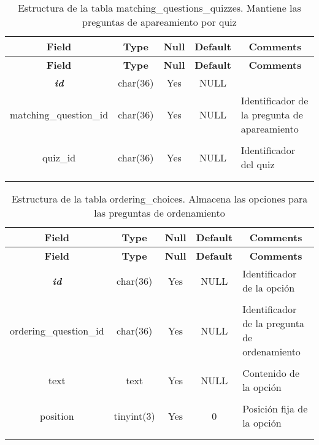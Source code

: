 %
%
\begin{longtable}{c c c c l}
	\multicolumn{1}{c}{\textbf{Field}} &
	\multicolumn{1}{c}{\textbf{Type}} &
	\multicolumn{1}{c}{\textbf{Null}} &
	\multicolumn{1}{c}{\textbf{Default}} &
	\multicolumn{1}{c}{\textbf{Comments}} \\ \hline \hline
\endfirsthead
	\multicolumn{1}{c}{\textbf{Field}} &
	\multicolumn{1}{c}{\textbf{Type}} &
	\multicolumn{1}{c}{\textbf{Null}} &
	\multicolumn{1}{c}{\textbf{Default}} &
	\multicolumn{1}{c}{\textbf{Comments}} \\ \hline \hline
\endhead \endfoot
	\textbf{\textit{id}} & char(36) & Yes & NULL \\ \hline 
	matching\_question\_id & char(36) & Yes & NULL & \parbox[t]{0.35\textwidth}{Identificador de la pregunta de apareamiento} \\ \\  \hline
	quiz\_id & char(36) & Yes & NULL & \parbox[t]{0.35\textwidth}{Identificador del quiz} \\ \\ 
\caption[Estructura de la tabla matching\_questions\_quizzes]{Estructura de la tabla matching\_questions\_quizzes. Mantiene las preguntas de apareamiento por quiz} \label{tab:quiz_matching_questions_quizzes-structure} \\
\end{longtable}

%
%
\begin{longtable}{c c c c l}
	\multicolumn{1}{c}{\textbf{Field}} &
	\multicolumn{1}{c}{\textbf{Type}} &
	\multicolumn{1}{c}{\textbf{Null}} &
	\multicolumn{1}{c}{\textbf{Default}} &
	\multicolumn{1}{c}{\textbf{Comments}} \\ \hline \hline
\endfirsthead
	\multicolumn{1}{c}{\textbf{Field}} &
	\multicolumn{1}{c}{\textbf{Type}} &
	\multicolumn{1}{c}{\textbf{Null}} &
	\multicolumn{1}{c}{\textbf{Default}} &
	\multicolumn{1}{c}{\textbf{Comments}} \\ \hline \hline
\endhead \endfoot
	\textbf{\textit{id}} & char(36) & Yes & NULL & \parbox[t]{0.35\textwidth}{Identificador de la opción} \\ \\  \hline
	ordering\_question\_id & char(36) & Yes & NULL  & \parbox[t]{0.35\textwidth}{Identificador de la pregunta de ordenamiento} \\ \\  \hline
	text & text & Yes & NULL  & \parbox[t]{0.35\textwidth}{Contenido de la opción} \\ \\  \hline
	position & tinyint(3) & Yes & 0  & \parbox[t]{0.35\textwidth}{Posición fija de la opción} \\ \\
\caption[Estructura de la tabla ordering\_choices]{Estructura de la tabla ordering\_choices. Almacena las opciones para las preguntas de ordenamiento} \label{tab:quiz_ordering_choices-structure} \\
\end{longtable}

